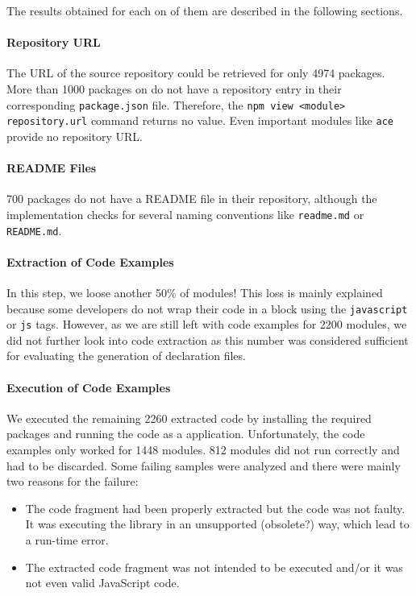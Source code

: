 \documentclass[a4paper,english,cleveref, autoref]{lipics-v2019}
\begin{document}
The results obtained for each on of them are described in the
following sections. 

\paragraph*{Repository URL}
The URL of the source repository could be retrieved for only 4974
packages. More than 1000 packages on \NPM{} do not have a repository
entry in their corresponding \texttt{package.json} file. Therefore, the
\texttt{npm view <module> repository.url} command returns no
value. Even important modules like \texttt{ace} provide no repository URL.

\paragraph*{README Files}
700 packages do not have a README file in their repository, although
the implementation checks for several naming conventions like
\texttt{readme.md} or \texttt{README.md}. 

\paragraph*{Extraction of Code Examples}
In this step, we loose another 50\% of modules! This loss is mainly
explained because some developers do not wrap their code in a block
using the \texttt{javascript} or \texttt{js} tags. However, as we are
still left with code examples for 2200 modules, we did not further
look into code extraction as this number was considered sufficient for
evaluating the generation of declaration files. 

\paragraph*{Execution of Code Examples}
We executed the remaining 2260 extracted code by installing the
required packages and running the code as a \NodeJS{}
application. Unfortunately, the code examples only worked for 1448
modules. 812 modules did not run correctly and had to be
discarded. Some failing samples were analyzed and there were mainly
two reasons for the failure: 
\begin{itemize}
\item The code fragment had been properly extracted but the code was
  not faulty. It was executing the library in an unsupported
  (obsolete?) way, which lead to a run-time error.
\item The extracted code fragment was not intended to be executed
  and/or it was not even valid JavaScript code. 
\end{itemize}
\end{document}
